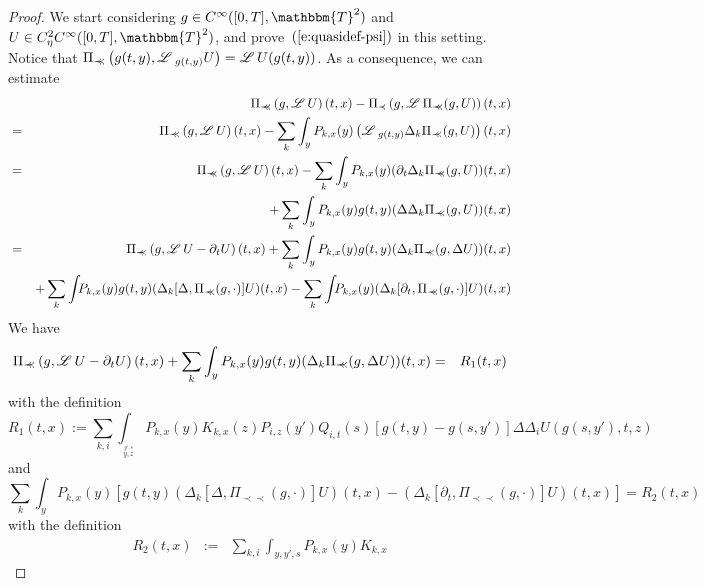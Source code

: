 \documentclass[11pt,reqno]{amsart}
\newcommand{\assign}{:=}
\newcommand{\precprec}{\prec\!\!\!\prec}
\newcommand{\LL}{\mathscr{L} \hspace{.2em}}
\begin{document}
\begin{proof}
  We start considering $g \in C^{\infty} ([0, T], \mathbbm{T}^2)$ and $U \in
  C_{\eta}^2 C^{\infty} ([0, T], \mathbbm{T}^2)$, and
  prove~$(\ref{e:quasidef-psi})$ in this setting. Notice that $\Pi_{\precprec}
  \left( g (t, y), \LL_{g (t, y)} U \right) = \LL U (g (t, y))$. As a
  consequence, we can estimate
  \begin{eqnarray*}
    &  & \Pi_{\precprec} \left( g, \LL U \right) (t, x) - \Pi_{\prec} \left(
    g, \LL \Pi_{\precprec} (g, U) \right) (t, x)\\
    & = & \Pi_{\precprec} \left( g, \LL U \right) (t, x) - \sum_k \int_y
    P_{k, x} (y) \left( \LL_{g (t, y)} \Delta_k \Pi_{\precprec} (g, U) \right)
    (t, x)\\
    & = & \Pi_{\precprec} \left( g, \LL U \right) (t, x) - \sum_k \int_y
    P_{k, x} (y) (\partial_t \Delta_k \Pi_{\precprec} (g, U)) (t, x)  \\
    &  & + \sum_k \int_y P_{k, x} (y) g (t, y) (\Delta \Delta_k
    \Pi_{\precprec} (g, U)) (t, x)\\
    & = & \Pi_{\precprec} \left( g, \LL U - \partial_t U \right) (t, x) +
    \sum_k \int_y P_{k, x} (y) g (t, y) (\Delta_k \Pi_{\precprec} (g, \Delta
    U)) (t, x)\\
    &  & + \sum_k \int_{} P_{k, x} (y) g (t, y) (\Delta_k [\Delta,
    \Pi_{\precprec} (g, \cdot)] U) (t, x) - \sum_k \int_{} P_{k, x} (y)
    (\Delta_k [\partial_t, \Pi_{\precprec} (g, \cdot)] U) (t, x)
  \end{eqnarray*}
  We have
  \begin{eqnarray*}
    \Pi_{\precprec} \left( g, \LL U - \partial_t U \right) (t, x) + \sum_k
    \int_y P_{k, x} (y) g (t, y) (\Delta_k \Pi_{\precprec} (g, \Delta U)) (t,
    x) & = & R_1 (t, x)
  \end{eqnarray*}
  with the definition
  \begin{equation}
    R_1 (t, x) \assign  \sum_{k, i} \int_{_{\overset{y', s}{y, z}}} P_{k, x} (y) K_{k, x} (z)
    P_{i, z} (y') Q_{i, t} (s) [g (t, y) - g (s, y')] \Delta \Delta_i U (g (s,
    y'), t, z) \label{e:rem-1}
  \end{equation}
  and
  \[ \sum_k \int_y P_{k, x} (y) [g (t, y) (\Delta_k [\Delta, \Pi_{\precprec}
     (g, \cdot)] U) (t, x) - (\Delta_k [\partial_t, \Pi_{\precprec} (g,
     \cdot)] U) (t, x)] = R_2 (t, x) \]
  with the definition
  \begin{eqnarray}
    R_2 (t, x) & \assign & \sum_{k, i} \int_{y, y', s} P_{k, x} (y) K_{k, x}

\end{eqnarray}
\end{proof}
\end{document}
